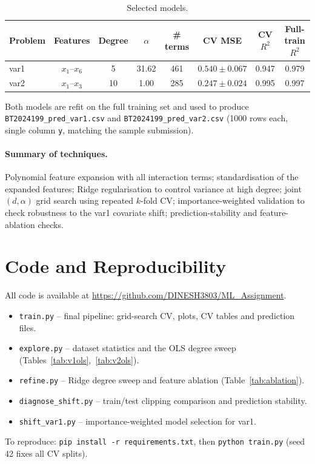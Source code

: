 \documentclass[11pt,a4paper]{article}
\newcommand{\repo}{\url{https://github.com/DINESH3803/ML_Assignment}}
\begin{document}
\begin{table}[H]
\centering
\small
\begin{tabular}{lccccccc}
\toprule
Problem & Features & Degree & $\alpha$ & \# terms & CV MSE & CV $R^2$ & Full-train $R^2$ \\
\midrule
var1 & $x_1$--$x_6$ & 5  & 31.62 & 461 & $0.540 \pm 0.067$ & 0.947 & 0.979 \\
var2 & $x_1$--$x_3$ & 10 & 1.00  & 285 & $0.247 \pm 0.024$ & 0.995 & 0.997 \\
\bottomrule
\end{tabular}
\caption{Selected models.}
\label{tab:final}
\end{table}

Both models are refit on the full training set and used to produce
\texttt{BT2024199\_pred\_var1.csv} and \texttt{BT2024199\_pred\_var2.csv}
(1000 rows each, single column \texttt{y}, matching the sample submission).

\paragraph{Summary of techniques.}
Polynomial feature expansion with all interaction terms; standardisation of the
expanded features; Ridge regularisation to control variance at high degree; joint
$(d,\alpha)$ grid search using repeated $k$-fold CV; importance-weighted validation
to check robustness to the var1 covariate shift; prediction-stability and
feature-ablation checks.

\section{Code and Reproducibility}
All code is available at \repo.
\begin{itemize}
  \item \texttt{train.py} -- final pipeline: grid-search CV, plots, CV tables and prediction files.
  \item \texttt{explore.py} -- dataset statistics and the OLS degree sweep (Tables~\ref{tab:v1ols},~\ref{tab:v2ols}).
  \item \texttt{refine.py} -- Ridge degree sweep and feature ablation (Table~\ref{tab:ablation}).
  \item \texttt{diagnose\_shift.py} -- train/test clipping comparison and prediction stability.
  \item \texttt{shift\_var1.py} -- importance-weighted model selection for var1.
\end{itemize}
To reproduce: \texttt{pip install -r requirements.txt}, then \texttt{python train.py}
(seed 42 fixes all CV splits).
\end{document}
